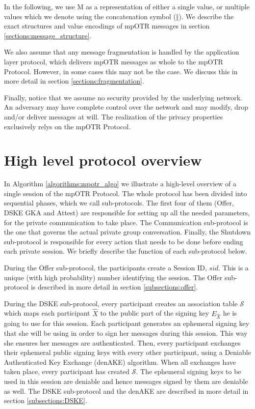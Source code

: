 In the following, we use M as a representation of either a single value, or multiple values which we denote using the concatenation symbol ($\Vert$). We describe the exact structures and value encodings of mpOTR messages in section \ref{sections:message_structure}.

We also assume that any message fragmentation is handled by the application layer protocol, which delivers mpOTR messages as whole to the mpOTR Protocol. However, in some cases this may not be the case. We discuss this in more detail in section \ref{sections:fragmentation}.

Finally, notice that we assume no security provided by the underlying network. An adversary may have complete control over the network and may modify, drop and/or deliver messages at will. The realization of the privacy properties exclusively relys on the mpOTR Protocol.

\section{High level protocol overview}
In Algorithm \ref{algorithms:mpotr_algo} we illustrate a high-level overview of a single session of the mpOTR Protocol. The whole protocol has been divided into sequential phases, which we call sub-protocols. The first four of them (Offer, DSKE GKA and Attest) are responsible for setting up all the needed parameters, for the private communication to take place. The Communication sub-protocol is the one that governs the actual private group conversation. Finally, the Shutdown sub-protocol is responsible for every action that needs to be done before ending each private session. We briefly describe the function of each sub-protocol below.

During the Offer sub-protocol, the participants create a Session ID, $sid$. This is a unique (with high probability) number identifying the session. The Offer sub-protocol is described in more detail in section \ref{subsections:offer}. 

During the DSKE sub-protocol, every participant creates an association table $\mathcal{S}$ which maps each participant $\hat{X}$ to the public part of the signing key $E_{\hat{X}}$ he is going to use for this session. Each participant generates an ephemeral signing key that she will be using in order to sign her messages during this session. This way she ensures her messages are authenticated. Then, every participant exchanges their ephemeral public signing keys with every other participant, using a Deniable Authenticated Key Exchange (denAKE) algorithm. When all exchanges have taken place, every participant has created $\mathcal{S}$. The ephemeral signing keys to be used in this session are deniable and hence messages signed by them are deniable as well. The DSKE sub-protocol and the denAKE are described in more detail in section \ref{subsections:DSKE}.


